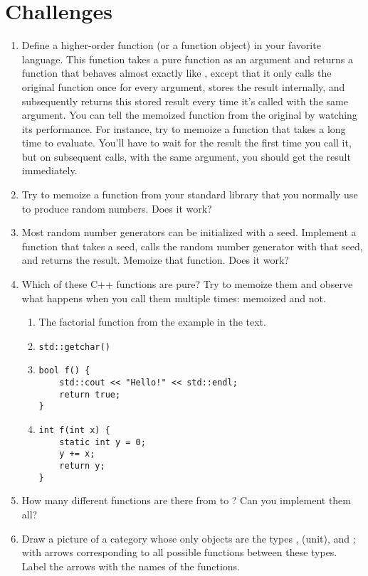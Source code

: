 \section{Challenges}

\begin{enumerate}
\tightlist
\item
  Define a higher-order function (or a function object) 
  in your favorite language. This function takes a pure function
   as an argument and returns a function that behaves almost
  exactly like , except that it only calls the original
  function once for every argument, stores the result internally, and
  subsequently returns this stored result every time it's called with
  the same argument. You can tell the memoized function from the
  original by watching its performance. For instance, try to memoize a
  function that takes a long time to evaluate. You'll have to wait for
  the result the first time you call it, but on subsequent calls, with
  the same argument, you should get the result immediately.
\item
  Try to memoize a function from your standard library that you normally
  use to produce random numbers. Does it work?
\item
  Most random number generators can be initialized with a seed.
  Implement a function that takes a seed, calls the random number
  generator with that seed, and returns the result. Memoize that
  function. Does it work?
\item
  Which of these C++ functions are pure? Try to memoize them and observe
  what happens when you call them multiple times: memoized and not.

  \begin{enumerate}
  \tightlist
  \item
    The factorial function from the example in the text.
  \item
\begin{verbatim}
std::getchar()
\end{verbatim}
  \item
\begin{verbatim}
bool f() { 
    std::cout << "Hello!" << std::endl;
    return true;
}
\end{verbatim}
  \item
\begin{verbatim}
int f(int x) {
    static int y = 0;
    y += x;
    return y;
}
\end{verbatim}
  \end{enumerate}
\item
  How many different functions are there from  to
  ? Can you implement them all?
\item
  Draw a picture of a category whose only objects are the types
  , \code{()} (unit), and ; with arrows
  corresponding to all possible functions between these types. Label the
  arrows with the names of the functions.
\end{enumerate}
